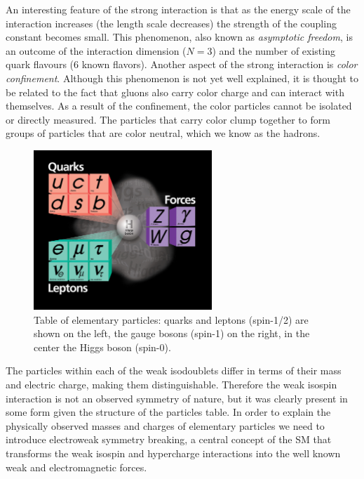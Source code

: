 An interesting feature of the strong interaction is that as the energy scale of the interaction 
increases (the length scale decreases) the strength of the coupling constant becomes small.
This phenomenon,
 also known as {\it asymptotic freedom},
 is an outcome of the interaction dimension ($N=3$) and the number of existing
quark flavours ($6$ known flavors).
 Another aspect of the strong interaction is {\it color
confinement}. Although this phenomenon is not yet well explained, it is thought to be
 related to the fact that gluons also carry color charge and can interact
with themselves. As a result of the confinement, the color particles 
cannot be isolated or directly measured. The particles that carry color
 clump together to form groups of particles that are color neutral, which we know as the hadrons.

\begin{figure}
\centering
\includegraphics[width=0.6\textwidth]{plots/intro/Higgs_SM.jpeg}
\caption{Table of elementary particles: quarks and leptons (spin-1/2) are shown on the left,
the gauge bosons (spin-1) on the right, in the center the Higgs boson (spin-0).
\label{fig:parttable}}

\end{figure}

The particles within each of the weak isodoublets differ in terms of their
mass and electric charge, making them distinguishable.
 Therefore the weak isospin interaction is
 not an observed symmetry of nature, but it was clearly present
in some form given the structure of the particles table. 
In order to explain the physically observed masses and charges of elementary
 particles we need to introduce electroweak symmetry breaking, a central concept
of the SM that transforms the
weak isospin and hypercharge interactions into the well known weak and electromagnetic forces.



